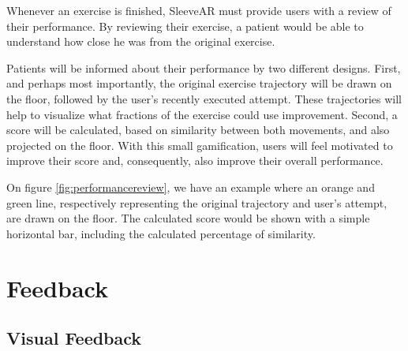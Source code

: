 Whenever an exercise is finished, SleeveAR must provide users with a review of their performance. 
By reviewing their exercise, a patient would be able to understand how close he was from the original exercise.

Patients will be informed about their performance by two different designs. 
First, and perhaps most importantly, the original exercise trajectory will be drawn on the floor, followed by the user's recently executed attempt. 
These trajectories will help to visualize what fractions of the exercise could use improvement.
Second, a score will be calculated, based on similarity between both movements, and also projected on the floor. 
With this small gamification, users will feel motivated to improve their score and, consequently, also improve their overall performance.

On figure \ref{fig:performancereview}, we have an example where an orange and green line, 
respectively representing the original trajectory and user's attempt, are drawn on the floor. 
The calculated score would be shown with a simple horizontal bar, including the calculated percentage of similarity.


\section{Feedback}
\label{sec:feedback}




\subsection{Visual Feedback}
\label{vision-feedback}


